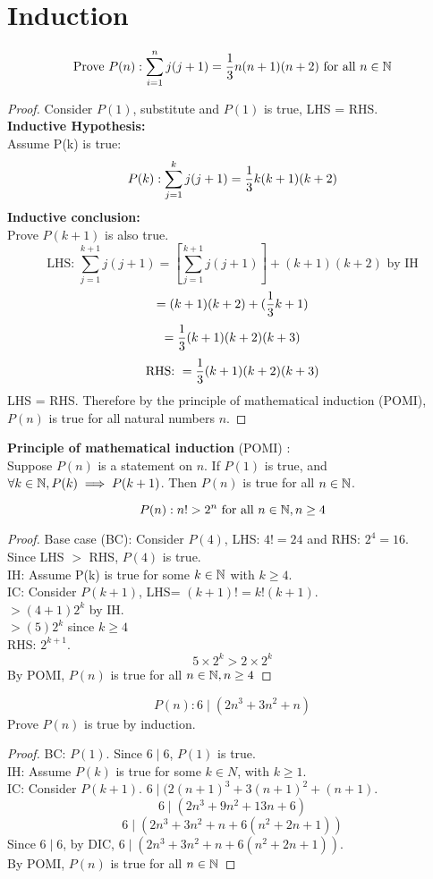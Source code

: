 \documentclass[english, 12pt]{article}
\begin{document}
\section{Induction}
\begin{exmp}
\[ \text{Prove } P(n): \sum_{i=1}^n j(j+1) = \frac{1}{3} n(n+1)(n+2) \text{ for all } n \in {\mathbb{N}} \]
\begin{proof}
Consider $P(1)$, substitute and $P(1)$ is true, LHS = RHS.\\
\textbf{Inductive Hypothesis:}\\
Assume P(k) is true:
\[P(k): \sum_{j=1}^k j(j+1) = \frac{1}{3} k(k+1)(k+2) \]
\textbf{Inductive conclusion:}\\
Prove $P(k+1)$ is also true.\\
\[\text{LHS: }\sum_{j=1}^{k+1} j(j+1) = [\sum_{j=1}^{k+1} j(j+1)] + (k+1)(k+2) \text{ by IH} \]
\[ = (k+1)(k+2) + (\frac{1}{3} k + 1) \]
\[ = \frac{1}{3} (k+1)(k+2)(k+3) \]
\[\text{RHS: } = \frac{1}{3} (k+1)(k+2)(k+3) \]
LHS = RHS. Therefore by the principle of mathematical induction (POMI), $P(n)$ is true for all natural numbers $n$.
\end{proof}
\end{exmp}
\begin{mthd}
\textbf{Principle of mathematical induction} (POMI) :\\
 Suppose $P(n)$ is a statement on $n$. If $P(1)$ is true, and 
$\forall k \in {\mathbb{N}}, P(k) \implies P(k+1)$. Then $P(n)$ is true for all $n \in {\mathbb{N}}$.
\end{mthd}
\begin{exmp}
\[P(n): n! > 2^n \text{ for all } n \in {\mathbb{N}}, n \geq 4\]
\begin{proof}
Base case (BC): Consider $P(4)$, LHS: $4! = 24$ and RHS: $2^4 = 16$.\\ Since LHS $>$ RHS, $P(4)$ is true.\\
IH: Assume P(k) is true for some $k \in {\mathbb{N}}$ with $k \geq 4$.\\
IC: Consider $P(k+1)$, LHS= $(k+1)! = k!(k+1)$.\\
 $> (4+1)2^k$ by IH.\\
  $> (5)2^k$ since $k \geq 4$\\
RHS: $2^{k+1}$.
\[ 5\times 2^k > 2\times 2^k \]
By POMI, $P(n)$ is true for all $n \in {\mathbb{N}}, n \geq 4$
\end{proof}
\end{exmp}
\begin{exercise}
\[P(n): 6 \mid (2n^3 + 3n^2 + n) \]
Prove $P(n)$ is true by induction.
\begin{proof}
BC: $P(1)$. Since $6 \mid 6$, $P(1)$ is true.\\
IH: Assume $P(k)$ is true for some $k \in N$, with $k \geq 1$.\\
IC: Consider $P(k+1)$. $6 \mid (2(n+1)^3 + 3(n+1)^2 + (n+1)$.
\[6 \mid (2n^3+9n^2+13n+6) \]
\[6 \mid (2n^3+3n^2 + n + 6(n^2 + 2n + 1)) \]
Since $6 \mid 6$, by DIC, $6 \mid (2n^3+3n^2 + n + 6(n^2 + 2n + 1))$.\\
By POMI, $P(n)$ is true for all $n \in {\mathbb{N}}$
\end{proof}
\end{exercise}
\end{document}
